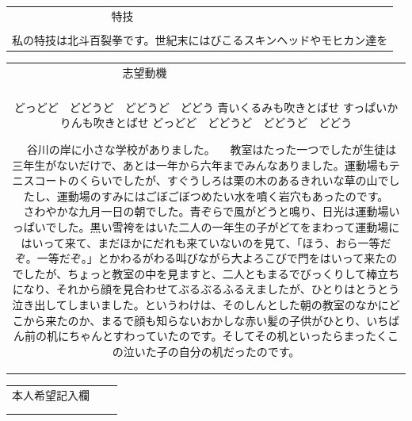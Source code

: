 \documentclass[a4j, 11pt]{jarticle}
\begin{document}
\begin{table}[p]
 \begin{tabular}{|ccc|}
\hline
  特技& & \\
  & & \\
  \multicolumn{3}{|p{40em}|}{\Large  私の特技は北斗百裂拳です。世紀末にはびこるスキンヘッドやモヒカン達を} \\ \hline
 \end{tabular}

\begin{tabular}{|ccc|}
\hline
 志望動機& & \\
 & & \\
  \multicolumn{3}{|p{40em}|}{\Large
 どっどど　どどうど　どどうど　どどう
青いくるみも吹きとばせ
すっぱいかりんも吹きとばせ
どっどど　どどうど　どどうど　どどう

　谷川の岸に小さな学校がありました。
　教室はたった一つでしたが生徒は三年生がないだけで、あとは一年から六年までみんなありました。運動場もテニスコートのくらいでしたが、すぐうしろは栗の木のあるきれいな草の山でしたし、運動場のすみにはごぼごぼつめたい水を噴く岩穴もあったのです。
　さわやかな九月一日の朝でした。青ぞらで風がどうと鳴り、日光は運動場いっぱいでした。黒い雪袴をはいた二人の一年生の子がどてをまわって運動場にはいって来て、まだほかにだれも来ていないのを見て、「ほう、おら一等だぞ。一等だぞ。」とかわるがわる叫びながら大よろこびで門をはいって来たのでしたが、ちょっと教室の中を見ますと、二人ともまるでびっくりして棒立ちになり、それから顔を見合わせてぶるぶるふるえましたが、ひとりはとうとう泣き出してしまいました。というわけは、そのしんとした朝の教室のなかにどこから来たのか、まるで顔も知らないおかしな赤い髪の子供がひとり、いちばん前の机にちゃんとすわっていたのです。そしてその机といったらまったくこの泣いた子の自分の机だったのです。} \\ \hline
\end{tabular}

\begin{tabular}{|ccc|}
\hline
本人希望記入欄 & & \\
 & & \\
  \multicolumn{3}{|p{40em}|}{\Large  } \\ \hline
\end{tabular}

\end{table}
\end{document}
